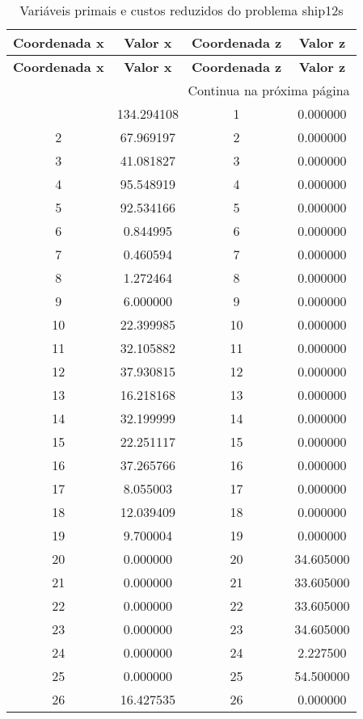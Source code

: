 \documentclass[12pt]{article}
\begin{document}
\begin{longtable}{@{}cccc@{}}
\caption{Variáveis primais e custos reduzidos do problema ship12s} \\
\toprule
\textbf{Coordenada x} & \textbf{Valor x} & \textbf{Coordenada z} & \textbf{Valor z} \\
\midrule
\endfirsthead

\toprule
\textbf{Coordenada x} & \textbf{Valor x} & \textbf{Coordenada z} & \textbf{Valor z} \\
\midrule
\endhead

\midrule \multicolumn{4}{r}{{Continua na próxima página}} \\ \midrule
\endfoot

\bottomrule
\endlastfoot
1 & 134.294108 & 1 & 0.000000 \\
2 & 67.969197 & 2 & 0.000000 \\
3 & 41.081827 & 3 & 0.000000 \\
4 & 95.548919 & 4 & 0.000000 \\
5 & 92.534166 & 5 & 0.000000 \\
6 & 0.844995 & 6 & 0.000000 \\
7 & 0.460594 & 7 & 0.000000 \\
8 & 1.272464 & 8 & 0.000000 \\
9 & 6.000000 & 9 & 0.000000 \\
10 & 22.399985 & 10 & 0.000000 \\
11 & 32.105882 & 11 & 0.000000 \\
12 & 37.930815 & 12 & 0.000000 \\
13 & 16.218168 & 13 & 0.000000 \\
14 & 32.199999 & 14 & 0.000000 \\
15 & 22.251117 & 15 & 0.000000 \\
16 & 37.265766 & 16 & 0.000000 \\
17 & 8.055003 & 17 & 0.000000 \\
18 & 12.039409 & 18 & 0.000000 \\
19 & 9.700004 & 19 & 0.000000 \\
20 & 0.000000 & 20 & 34.605000 \\
21 & 0.000000 & 21 & 33.605000 \\
22 & 0.000000 & 22 & 33.605000 \\
23 & 0.000000 & 23 & 34.605000 \\
24 & 0.000000 & 24 & 2.227500 \\
25 & 0.000000 & 25 & 54.500000 \\
26 & 16.427535 & 26 & 0.000000 \\

\end{longtable}
\end{document}
